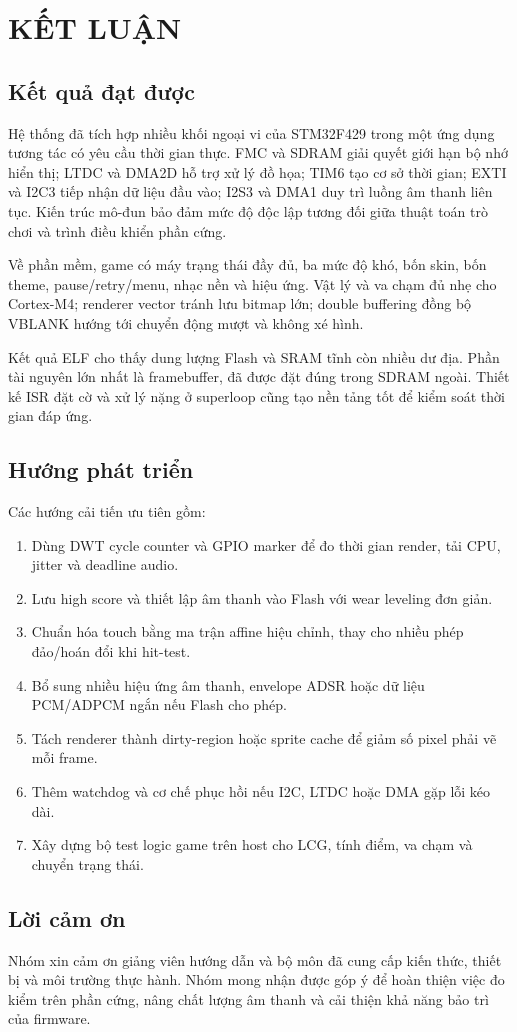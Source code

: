\chapter{KẾT LUẬN}

\section{Kết quả đạt được}

Hệ thống đã tích hợp nhiều khối ngoại vi của STM32F429 trong một ứng dụng tương tác có yêu cầu thời gian thực. FMC và SDRAM giải quyết giới hạn bộ nhớ hiển thị; LTDC và DMA2D hỗ trợ xử lý đồ họa; TIM6 tạo cơ sở thời gian; EXTI và I2C3 tiếp nhận dữ liệu đầu vào; I2S3 và DMA1 duy trì luồng âm thanh liên tục. Kiến trúc mô-đun bảo đảm mức độ độc lập tương đối giữa thuật toán trò chơi và trình điều khiển phần cứng.

Về phần mềm, game có máy trạng thái đầy đủ, ba mức độ khó, bốn skin, bốn theme, pause/retry/menu, nhạc nền và hiệu ứng. Vật lý và va chạm đủ nhẹ cho Cortex-M4; renderer vector tránh lưu bitmap lớn; double buffering đồng bộ VBLANK hướng tới chuyển động mượt và không xé hình.

Kết quả ELF cho thấy dung lượng Flash và SRAM tĩnh còn nhiều dư địa. Phần tài nguyên lớn nhất là framebuffer, đã được đặt đúng trong SDRAM ngoài. Thiết kế ISR đặt cờ và xử lý nặng ở superloop cũng tạo nền tảng tốt để kiểm soát thời gian đáp ứng.

\section{Hướng phát triển}

Các hướng cải tiến ưu tiên gồm:

\begin{enumerate}
  \item Dùng DWT cycle counter và GPIO marker để đo thời gian render, tải CPU, jitter và deadline audio.
  \item Lưu high score và thiết lập âm thanh vào Flash với wear leveling đơn giản.
  \item Chuẩn hóa touch bằng ma trận affine hiệu chỉnh, thay cho nhiều phép đảo/hoán đổi khi hit-test.
  \item Bổ sung nhiều hiệu ứng âm thanh, envelope ADSR hoặc dữ liệu PCM/ADPCM ngắn nếu Flash cho phép.
  \item Tách renderer thành dirty-region hoặc sprite cache để giảm số pixel phải vẽ mỗi frame.
  \item Thêm watchdog và cơ chế phục hồi nếu I2C, LTDC hoặc DMA gặp lỗi kéo dài.
  \item Xây dựng bộ test logic game trên host cho LCG, tính điểm, va chạm và chuyển trạng thái.
\end{enumerate}

\section{Lời cảm ơn}

Nhóm xin cảm ơn giảng viên hướng dẫn và bộ môn đã cung cấp kiến thức, thiết bị và môi trường thực hành. Nhóm mong nhận được góp ý để hoàn thiện việc đo kiểm trên phần cứng, nâng chất lượng âm thanh và cải thiện khả năng bảo trì của firmware.
